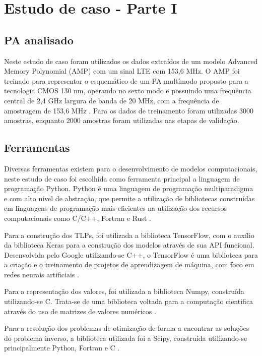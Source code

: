 \chapter{Estudo de caso - Parte I} \label{cha:estudoi}
\section{PA analisado} \label{sec:estudoi-pa}
Neste estudo de caso foram utilizados os dados extraídos de um modelo Advanced Memory Polynomial (AMP) com um sinal LTE com 153,6 MHz. O AMP foi treinado para representar o esquemático de um PA multímodo proposto para a tecnologia CMOS 130 nm, operando no sexto modo e possuindo uma frequência central de 2,4 GHz largura de banda de 20 MHz, com a frequência de amostragem de 153,6 MHz \cite{dos2017fully} \cite{schuartz2019reduced}. Para os dados de treinamento foram utilizadas 3000 amostras, enquanto 2000 amostras foram utilizadas nas etapas de validação.

\section{Ferramentas} \label{sec:estudoi-ferr}
Diversas ferramentas existem para o desenvolvimento de modelos computacionais, neste estudo de caso foi escolhida como ferramenta principal a linguagem de programação Python. Python é uma linguagem de programação multiparadigma e com alto nível de abstração, que permite a utilização de bibliotecas construídas em linguagens de programação mais eficientes na utilização dos recursos computacionais como C/C++, Fortran e Rust \cite{Ramalho2022-zg}.

Para a construção dos TLPs, foi utilizada a biblioteca TensorFlow, com o auxílio da biblioteca Keras para a construção dos modelos através de sua API funcional. Desenvolvida pelo Google utilizando-se C++, o TensorFlow é uma biblioteca para a criação e o treinamento de projetos de aprendizagem de máquina, com foco em redes neurais artificiais \cite{tensorflow2015-whitepaper}.

Para a representação dos valores, foi utilizada a biblioteca Numpy, construída utilizando-se C. Trata-se de uma biblioteca voltada para a computação cientifica através do uso de matrizes de valores numéricos \cite{harris2020array}.

Para a resolução dos problemas de otimização de forma a encontrar as soluções do problema inverso, a biblioteca utilizada foi a Scipy, construída utilizando-se principalmente Python, Fortran e C \cite{2020SciPy-NMeth}.

